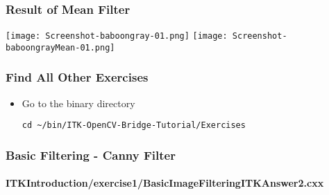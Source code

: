\begin{frame}[fragile]
\frametitle{Result of Mean Filter}
\begin{center}
  \texttt{[image: Screenshot-baboongray-01.png]}
  \texttt{[image: Screenshot-baboongrayMean-01.png]}
\end{center}
\end{frame}

\begin{frame}[fragile]
\frametitle{Find All Other Exercises}
\begin{itemize}
\item Go to the binary directory
\begin{verbatim}
cd ~/bin/ITK-OpenCV-Bridge-Tutorial/Exercises
\end{verbatim}
\end{itemize}
\end{frame}

\begin{frame}
\frametitle{Basic Filtering - Canny Filter}
\framesubtitle{ITKIntroduction/exercise1/BasicImageFilteringITKAnswer2.cxx}
\end{frame}

